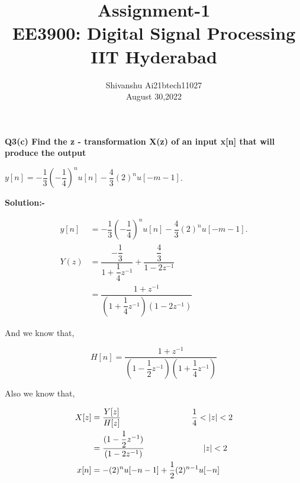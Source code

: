 \documentclass[12pt]{IEEEtran}
\title{\textbf{Assignment-1}\\ \large EE3900: Digital Signal Processing\\ IIT Hyderabad}
\author{Shivanshu  Ai21btech11027\\ August 30,2022}
\begin{document}
    \maketitle
    \textbf{Q3(c)\hspace{1mm} Find the z - transformation X(z) of an input x[n] that will produce the output}
    \begin{center}
        $y[n] = -\dfrac{1}{3}(-\dfrac{1}{4})^n u[n] - \dfrac{4}{3}(2)^nu[-m-1]$.
    \end{center}
    

    \textbf{Solution:-}
    
    \begin{align}
        y[n] &= -\dfrac{1}{3}(-\dfrac{1}{4})^n u[n] - \dfrac{4}{3}(2)^nu[-m-1]. \\
        Y(z) &= \dfrac{-\dfrac{1}{3}}{1+\dfrac{1}{4}z^{-1}} + \dfrac{\dfrac{4}{3}}{1-2z^{-1}} \\
             &= \dfrac{1+z^{-1}}{(1+\dfrac{1}{4}z^{-1})(1-2z^{-1})} 
    \end{align}

    And we know that,
    
    \begin{equation}
        H[n] = \dfrac{1+z^{-1}}{(1-\dfrac{1}{2}z^{-1})(1+\dfrac{1}{4}z^{-1})}
    \end{equation}

    Also we know that,

    \begin{align}
        X[z] &= \dfrac{Y[z]}{H[z]}  \hspace{30mm} \frac{1}{4}<|z|<2\\
             &=\dfrac{(1-\dfrac{1}{2}z^{-1})}{(1-2z^{-1})} \hspace{25mm} |z| < 2 \\
        x[n] &= -(2)^nu[-n-1] + \dfrac{1}{2}(2)^{n-1}u[-n]
    \end{align}
    
\end{document}
